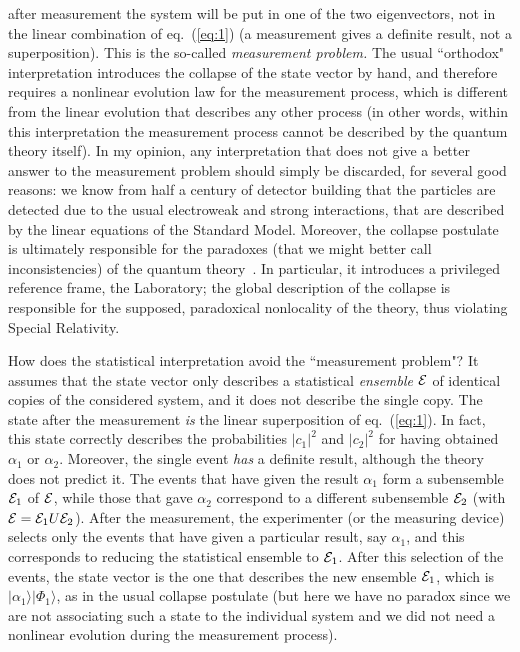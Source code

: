 \documentclass[12pt]{article}
\begin{document}
after measurement the system will be put in one of the two
eigenvectors, not in the linear combination of eq.~(\ref{eq:1}) (a
measurement gives a definite result, not a superposition). This is the
so-called \emph{measurement problem.} The usual ``orthodox"
interpretation introduces the collapse of the state vector by hand,
and therefore requires a nonlinear evolution law for the measurement
process, which is different from the linear evolution that describes
any other process (in other words, within this interpretation the
measurement process cannot be described by the quantum theory
itself). In my opinion, any interpretation that does not give a better
answer to the measurement problem should simply be discarded, for
several good reasons: we know from half a century of detector building
that the particles are detected due to the usual electroweak and
strong interactions, that are described by the linear equations of the
Standard Model. Moreover, the collapse postulate is ultimately
responsible for the paradoxes (that we might better call
inconsistencies) of the quantum theory~\cite{Ballentine70,Laloe}. In
particular, it introduces a privileged reference frame, the
Laboratory; the global description of the collapse is responsible for
the supposed, paradoxical nonlocality of the theory, thus violating
Special Relativity.

How does the statistical interpretation avoid the ``measurement
problem"? It assumes that the state vector only describes a
statistical \emph{ensemble} ${\cal E}$ of identical copies of the
considered system, and it does not describe the single copy. The
state after the measurement \emph{is} the linear superposition of
eq.~(\ref{eq:1}). In fact, this state correctly describes the
probabilities $\vert c_1\vert^2$ and $\vert c_2\vert^2$  for
having obtained $\alpha_1$ or $\alpha_2$. Moreover, the single
event \emph{has} a definite result, although the theory does not
predict it. The events that have given the result $\alpha_1$ form
a subensemble ${\cal E}_1$ of ${\cal E}$, while those that gave
$\alpha_2$ correspond to a different subensemble ${\cal E}_2$
(with ${\cal E}={\cal E}_1U{\cal E}_2$). After the measurement,
the experimenter (or the measuring device) selects only the events
that have given a particular result, say $\alpha_1$, and this
corresponds to reducing the statistical ensemble to  ${\cal E}_1$.
After this selection of the events, the state vector is the one
that describes the new ensemble ${\cal E}_1$, which is $\vert
\alpha_1\rangle\vert\Phi_1\rangle$, as in the usual collapse
postulate (but here we have no paradox since we are not
associating such a state to the individual system and we did not
need a nonlinear evolution during the measurement process).
\end{document}
